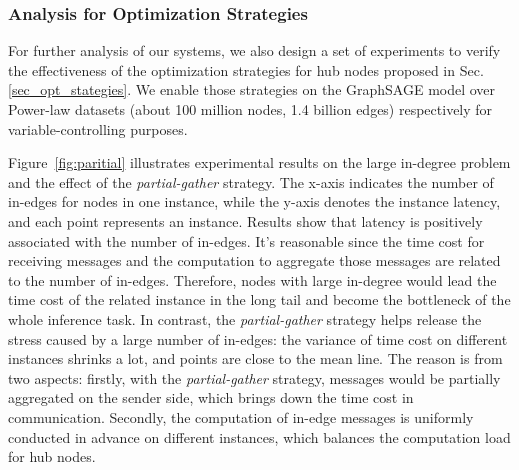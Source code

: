 \documentclass[conference]{IEEEtran}
\begin{document}
\subsubsection{Analysis for Optimization Strategies}
\label{sec_analyis_strategies}
For further analysis of our systems, we also design a set of experiments to verify the effectiveness of the optimization strategies for hub nodes proposed in Sec. \ref{sec_opt_stategies}.
We enable those strategies on the GraphSAGE model over Power-law datasets (about 100 million nodes, 1.4 billion edges) respectively for variable-controlling purposes.

Figure~\ref{fig:paritial} illustrates experimental results on the large in-degree problem and the effect of the \emph{partial-gather} strategy. 
The x-axis indicates the number of in-edges for nodes in one instance, while the y-axis denotes the instance latency, and each point represents an instance.
Results show that latency is positively associated with the number of in-edges.
It's reasonable since the time cost for receiving messages and the computation to aggregate those messages are related to the number of in-edges.
Therefore, nodes with large in-degree would lead the time cost of the related instance in the long tail and become the bottleneck of the whole inference task.
In contrast, the \emph{partial-gather} strategy helps release the stress caused by a large number of in-edges: the variance of time cost on different instances shrinks a lot, and points are close to the mean line.
The reason is from two aspects: firstly, with the \emph{partial-gather} strategy, messages would be partially aggregated on the sender side, which brings down the time cost in communication.
Secondly, the computation of in-edge messages is uniformly conducted in advance on different instances, which balances the computation load for hub nodes. 
\end{document}
